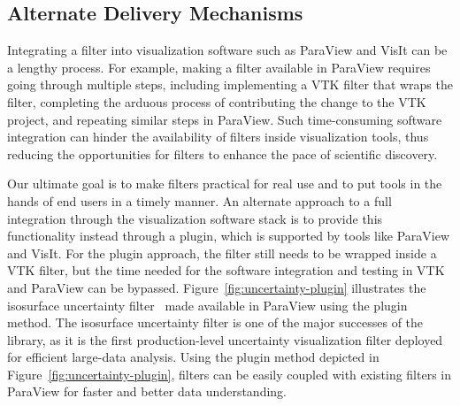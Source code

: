 
\subsection{Alternate Delivery Mechanisms}


Integrating a \vtkm filter into visualization software such as ParaView and VisIt can be a lengthy process. For example, making a \vtkm filter available in ParaView requires going through multiple steps, including implementing a VTK filter that wraps the \vtkm filter, completing the arduous process of contributing the change to the VTK project, and repeating similar steps in ParaView. Such time-consuming software integration can hinder the availability of \vtkm filters inside visualization tools, thus reducing the opportunities for \vtkm filters to enhance the pace of scientific discovery. 

Our ultimate goal is to make \vtkm filters practical for real use and to put tools in the hands of end users in a timely manner.
An alternate approach to a full integration through the visualization software stack is to provide this functionality instead through a plugin, which is supported by tools like ParaView and VisIt.
For the plugin approach, the \vtkm filter still needs to be wrapped inside a VTK filter, but the time needed for the software integration and testing in VTK and ParaView can be bypassed. Figure~\ref{fig:uncertainty-plugin} illustrates the \vtkm isosurface uncertainty filter~\cite{Wang2023, Athawale21} made available in ParaView using the plugin method. The isosurface uncertainty filter is one of the major successes of the \vtkm library, as it is the first production-level uncertainty visualization filter deployed for efficient large-data analysis. Using the plugin method depicted in Figure~\ref{fig:uncertainty-plugin}, \vtkm filters can be easily coupled with existing filters in ParaView for faster and better data understanding.       

